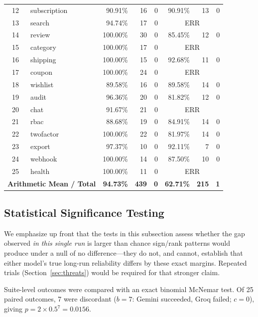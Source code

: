 \documentclass[conference]{IEEEtran}
\begin{document}
\begin{table}[ht]
\begin{tabular}{@{}clrrrrrr@{}}
12 & subscription   & 90.91\%  & 16 & 0 & 90.91\%  & 13 &  0 \\
13 & search         & 94.74\%  & 17 & 0 & \multicolumn{3}{c}{ERR} \\
14 & review         & 100.00\% & 30 & 0 & 85.45\%  & 12 &  0 \\
15 & category       & 100.00\% & 17 & 0 & \multicolumn{3}{c}{ERR} \\
16 & shipping       & 100.00\% & 15 & 0 & 92.68\%  & 11 &  0 \\
17 & coupon         & 100.00\% & 24 & 0 & \multicolumn{3}{c}{ERR} \\
18 & wishlist       & 89.58\%  & 16 & 0 & 89.58\%  & 14 &  0 \\
19 & audit          & 96.36\%  & 20 & 0 & 81.82\%  & 12 &  0 \\
20 & chat           & 91.67\%  & 21 & 0 & \multicolumn{3}{c}{ERR} \\
21 & rbac           & 88.68\%  & 19 & 0 & 84.91\%  & 14 &  0 \\
22 & twofactor      & 100.00\% & 22 & 0 & 81.97\%  & 14 &  0 \\
23 & export         & 97.37\%  & 10 & 0 & 92.11\%  &  7 &  0 \\
24 & webhook        & 100.00\% & 14 & 0 & 87.50\%  & 10 &  0 \\
25 & health         & 100.00\% & 11 & 0 & \multicolumn{3}{c}{ERR} \\
\midrule
\multicolumn{2}{l}{\textbf{Arithmetic Mean / Total}} & \textbf{94.73\%} & \textbf{439} & \textbf{0} & \textbf{62.71\%} & \textbf{215} & \textbf{1} \\
\bottomrule
\end{tabular}
\end{table}

\subsection{Statistical Significance Testing}
\label{sec:stats}

We emphasize up front that the tests in this subsection assess whether the gap observed \emph{in this single run} is larger than chance sign/rank patterns would produce under a null of no difference---they do not, and cannot, establish that either model's true long-run reliability differs by these exact margins. Repeated trials (Section~\ref{sec:threats}) would be required for that stronger claim.

Suite-level outcomes were compared with an exact binomial McNemar test. Of 25 paired outcomes, 7 were discordant ($b=7$: Gemini succeeded, Groq failed; $c=0$), giving $p = 2 \times 0.5^7 = 0.0156$.
\end{document}
